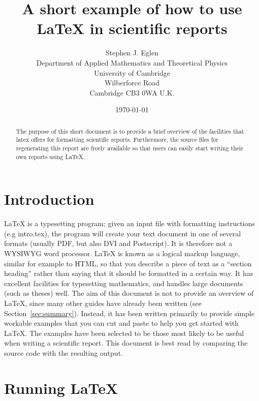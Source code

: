 \documentclass[]{article}
\providecommand*{\latex}{\LaTeX\xspace}
\begin{document}
\author{Stephen J. Eglen\\
  Department of Applied Mathematics and Theoretical Physics\\
  University of Cambridge\\
  Wilberforce Road\\
  Cambridge CB3 0WA  U.K.}
\date{\today}
\title{A short example of how to use \latex in scientific reports}
\maketitle

\begin{abstract}
  The purpose of this short document is to provide a brief overview of
  the facilities that latex offers for formatting scientific reports.
  Furthermore, the source files for regenerating this report are
  freely available so that users can easily start writing their own
  reports using \latex.
\end{abstract}

\section{Introduction}

\latex is a typesetting program; given an input file with formatting
instructions (e.g intro.tex), the program will create your text
document in one of several formats (usually PDF, but also DVI and
Postscript).  It is therefore not a WYSIWYG word processor.  \latex is
known as a logical markup language, similar for example to HTML, so
that you describe a piece of text as a ``section heading'' rather than
saying that it should be formatted in a certain way.  It has excellent
facilities for typesetting mathematics, and handles large documents
(such as theses) well.  The aim of this document is not to provide an
overview of \latex, since many other guides have already been written
(see Section~\ref{sec:summary}).  Instead, it has been written
primarily to provide simple workable examples that you can cut and
paste to help you get started with \latex.  The examples have been
selected to be those most likely to be useful when writing a
scientific report.  This document is best read by comparing the source
code with the resulting output.

\section{Running \latex}
\end{document}
